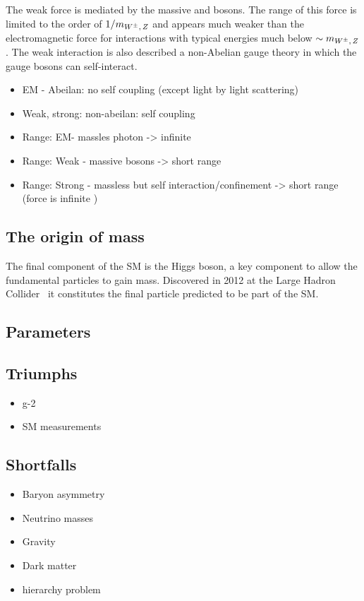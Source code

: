 The weak force is mediated by the massive \Wpm and \Z bosons. The range of this force is limited to the order of $1/m_{{W^\pm},\,{Z}}$ and appears much weaker than the electromagnetic force for interactions with typical energies much below $\sim m_{{W^\pm},\,{Z}}$. The weak interaction is also described a non-Abelian gauge theory in which the gauge bosons can self-interact. 

{\color{Red}
\begin{itemize}
\item EM - Abeilan: no self coupling (except light by light scattering)
\item Weak, strong: non-abeilan: self coupling
\item Range: EM- massles photon -> infinite 
\item Range: Weak - massive bosons -> short range
\item Range: Strong - massless but self interaction/confinement -> short range (force is infinite )
\end{itemize}}


\subsection{The origin of mass}
The final component of the SM is the Higgs boson, a key component to allow the fundamental particles to gain mass. Discovered in 2012 at the Large Hadron Collider~\cite{20121,201230} it constitutes the final particle predicted to be part of the SM. 

\subsection{Parameters}


\subsection{Triumphs}

\begin{itemize}
\item g-2
\item SM measurements
\end{itemize}

\subsection{Shortfalls}
\begin{itemize}
\item Baryon asymmetry 
\item Neutrino masses
\item Gravity
\item Dark matter
\item hierarchy problem
\end{itemize}

